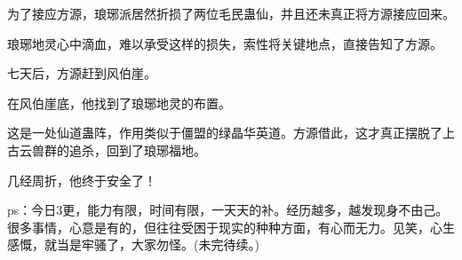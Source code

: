 \begin{this_body}
为了接应方源，琅琊派居然折损了两位毛民蛊仙，并且还未真正将方源接应回来。

琅琊地灵心中滴血，难以承受这样的损失，索性将关键地点，直接告知了方源。

七天后，方源赶到风伯崖。

在风伯崖底，他找到了琅琊地灵的布置。

这是一处仙道蛊阵，作用类似于僵盟的绿晶华英道。方源借此，这才真正摆脱了上古云兽群的追杀，回到了琅琊福地。

几经周折，他终于安全了！

ps：今日3更，能力有限，时间有限，一天天的补。经历越多，越发现身不由己。很多事情，心意是有的，但往往受困于现实的种种方面，有心而无力。见笑，心生感慨，就当是牢骚了，大家勿怪。(未完待续。)

\end{this_body}

